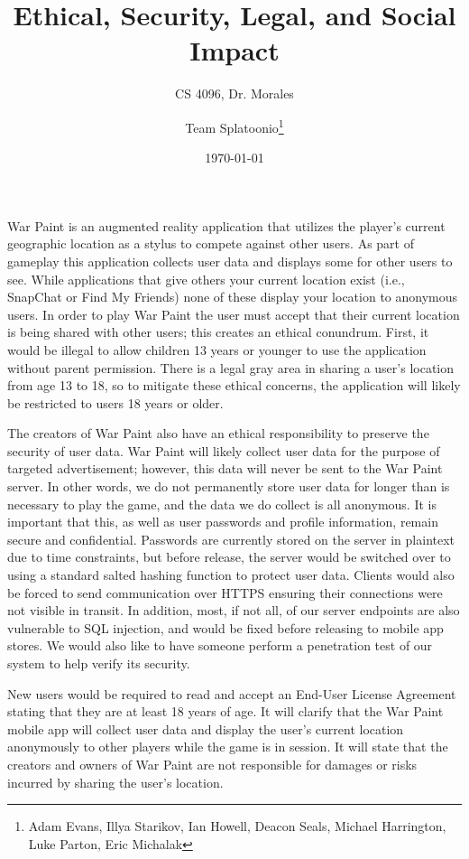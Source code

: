 \documentclass[12pt,listof=totoc,toc=sectionentrywithdots]{scrartcl}
\title{Ethical, Security, Legal, and Social Impact}
\subtitle{CS 4096, Dr. Morales}
\date{\today}
\author{Team Splatoonio\thanks{Adam Evans, Illya Starikov, Ian Howell, Deacon Seals, Michael Harrington, Luke Parton, Eric Michalak}}
\begin{document}
\maketitle


War Paint is an augmented reality application that utilizes the player’s current geographic location as a stylus to compete against other users. As part of gameplay this application collects user data and displays some for other users to see. While applications that give others your current location exist (i.e., SnapChat or Find My Friends) none of these display your location to anonymous users. In order to play War Paint the user must accept that their current location is being shared with other users; this creates an ethical conundrum. First, it would be illegal to allow children 13 years or younger to use the application without parent permission. There is a legal gray area in sharing a user’s location from age 13 to 18, so to mitigate these ethical concerns, the application will likely be restricted to users 18 years or older.

The creators of War Paint also have an ethical responsibility to preserve the security of user data. War Paint will likely collect user data for the purpose of targeted advertisement; however, this data will never be sent to the War Paint server. In other words, we do not permanently store user data for longer than is necessary to play the game, and the data we do collect is all anonymous. It is important that this, as well as user passwords and profile information, remain secure and confidential. Passwords are currently stored on the server in plaintext due to time constraints, but before release, the server would be switched over to using a standard salted hashing function to protect user data. Clients would also be forced to send communication over HTTPS ensuring their connections were not visible in transit. In addition, most, if not all, of our server endpoints are also vulnerable to SQL injection, and would be fixed before releasing to mobile app stores. We would also like to have someone perform a penetration test of our system to help verify its security.

New users would be required to read and accept an End-User License Agreement stating that they are at least 18 years of age. It will clarify that the War Paint mobile app will collect user data and display the user’s current location anonymously to other players while the game is in session. It will state that the creators and owners of War Paint are not responsible for damages or risks incurred by sharing the user’s location.
\end{document}
